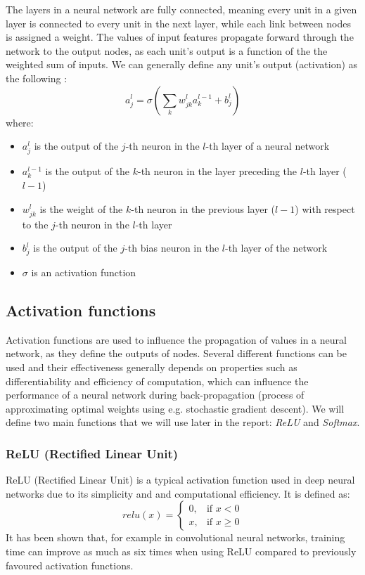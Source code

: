 \par
The layers in a neural network are fully connected, meaning every unit in a given layer is connected to every unit in the next layer, while each link between nodes is assigned a weight. The values of input features propagate forward through the network to the output nodes, as each unit's output is a function of the the weighted sum of inputs. We can generally define any unit's output (activation) as the following \cite{nielsenneural}:
\begin{equation*}
     a^{l}_j = \sigma\left( \sum_k w^{l}_{jk} a^{l-1}_k + b^l_j \right) 
     \label{eq:neuron_output}
\end{equation*}
where:
\begin{itemize}
    \item $a_j^l$ is the output of the $j$-th neuron in the $l$-th layer of a neural network
    \item $a_k^{l-1}$ is the output of the $k$-th neuron in the layer preceding the $l$-th layer ($l-1$)
    \item $w_{jk}^l$ is the weight of the $k$-th neuron in the previous layer ($l-1$) with respect to the $j$-th neuron in the $l$-th layer
    \item $b_j^l$ is the output of the $j$-th bias neuron in the $l$-th layer of the network
    \item $\sigma$ is an activation function
\end{itemize}

\subsection{Activation functions}
\label{sec:activation_functions}
Activation functions are used to influence the propagation of values in a neural network, as they define the outputs of nodes. Several different functions can be used and their effectiveness generally depends on properties such as differentiability and efficiency of computation, which can influence the performance of a neural network during back-propagation (process of approximating optimal weights using e.g. stochastic gradient descent). We will define two main functions that we will use later in the report: \textit{ReLU} and \textit{Softmax}.

\subsubsection{ReLU (Rectified Linear Unit)}
ReLU (Rectified Linear Unit) is a typical activation function used in deep neural networks due to its simplicity and and computational efficiency. It is defined as:
\begin{equation*}
    relu(x) = 
    \begin{cases}
        0,  & \text{if } x < 0\\
        x,  & \text{if } x \geq 0
    \end{cases}
\end{equation*}
It has been shown that, for example in convolutional neural networks, training time can improve as much as six times when using ReLU compared to previously favoured activation functions.\cite{krizhevsky2012imagenet}

